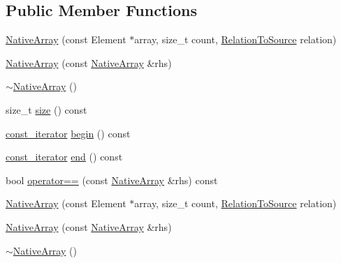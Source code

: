 \subsection*{\-Public \-Member \-Functions}
\begin{DoxyCompactItemize}
\item 
\hyperlink{classtesting_1_1internal_1_1NativeArray_ab682efe961f1119802c45452c353a4b5}{\-Native\-Array} (const \-Element $\ast$array, size\-\_\-t count, \hyperlink{namespacetesting_1_1internal_ac00b9b1c1f19789e7b9ffda5a5d6cbf6}{\-Relation\-To\-Source} relation)
\item 
\hyperlink{classtesting_1_1internal_1_1NativeArray_a66f5b6b724d55af9a8a5b5d61d44c368}{\-Native\-Array} (const \hyperlink{classtesting_1_1internal_1_1NativeArray}{\-Native\-Array} \&rhs)
\item 
\hyperlink{classtesting_1_1internal_1_1NativeArray_adcd158e2ef75d0d5ab8b279c7693d920}{$\sim$\-Native\-Array} ()
\item 
size\-\_\-t \hyperlink{classtesting_1_1internal_1_1NativeArray_aac782da1f912bceb5d8ad00c8dc892ac}{size} () const 
\item 
\hyperlink{classtesting_1_1internal_1_1NativeArray_a673a2c2010a7e9bdcc7b6b75d54121f5}{const\-\_\-iterator} \hyperlink{classtesting_1_1internal_1_1NativeArray_aa4b02d4f1a8500fb07a551069060709f}{begin} () const 
\item 
\hyperlink{classtesting_1_1internal_1_1NativeArray_a673a2c2010a7e9bdcc7b6b75d54121f5}{const\-\_\-iterator} \hyperlink{classtesting_1_1internal_1_1NativeArray_a350132543d80a1c1e5be844e6d2878ea}{end} () const 
\item 
bool \hyperlink{classtesting_1_1internal_1_1NativeArray_ac0b5a9c6c5dc5e3f22622e7045810cec}{operator==} (const \hyperlink{classtesting_1_1internal_1_1NativeArray}{\-Native\-Array} \&rhs) const 
\item 
\hyperlink{classtesting_1_1internal_1_1NativeArray_ab682efe961f1119802c45452c353a4b5}{\-Native\-Array} (const \-Element $\ast$array, size\-\_\-t count, \hyperlink{namespacetesting_1_1internal_ac00b9b1c1f19789e7b9ffda5a5d6cbf6}{\-Relation\-To\-Source} relation)
\item 
\hyperlink{classtesting_1_1internal_1_1NativeArray_a66f5b6b724d55af9a8a5b5d61d44c368}{\-Native\-Array} (const \hyperlink{classtesting_1_1internal_1_1NativeArray}{\-Native\-Array} \&rhs)
\item 
\hyperlink{classtesting_1_1internal_1_1NativeArray_adcd158e2ef75d0d5ab8b279c7693d920}{$\sim$\-Native\-Array} ()
\item 

\end{DoxyCompactItemize}
